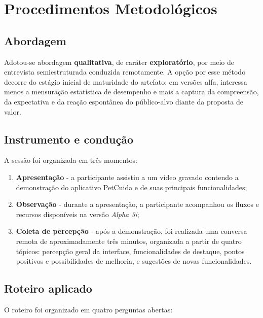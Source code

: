 \documentclass[12pt,a4paper]{article}
\begin{document}
\section{Procedimentos Metodológicos}

\subsection{Abordagem}

Adotou-se abordagem \textbf{qualitativa}, de caráter \textbf{exploratório}, por meio de
entrevista semiestruturada conduzida remotamente. A opção por esse método decorre do
estágio inicial de maturidade do artefato: em versões alfa, interessa menos a mensuração
estatística de desempenho e mais a captura da compreensão, da expectativa e da reação
espontânea do público-alvo diante da proposta de valor.

\subsection{Instrumento e condução}

A sessão foi organizada em três momentos:

\begin{enumerate}[label=\textbf{\arabic*.}]
  \item \textbf{Apresentação} - a participante assistiu a um vídeo gravado contendo a
        demonstração do aplicativo PetCuida e de suas principais funcionalidades;
  \item \textbf{Observação} - durante a apresentação, a participante acompanhou os fluxos
        e recursos disponíveis na versão \textit{Alpha 3i};
  \item \textbf{Coleta de percepção} - após a demonstração, foi realizada uma conversa
        remota de aproximadamente três minutos, organizada a partir de quatro tópicos:
        percepção geral da interface, funcionalidades de destaque, pontos positivos e
        possibilidades de melhoria, e sugestões de novas funcionalidades.
\end{enumerate}

\subsection{Roteiro aplicado}

O roteiro foi organizado em quatro perguntas abertas:
\end{document}
